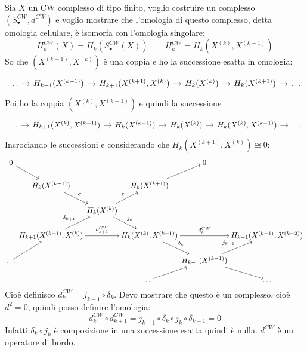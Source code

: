 Sia $ X $ un CW complesso di tipo finito, voglio costruire un complesso $ (S_\bullet^{CW}, d^{CW}) $ e
voglio mostrare che l'omologia di questo complesso, detta omologia cellulare, è isomorfa con
l'omologia singolare:
\[
  H_k^{CW}(X) = H_k(S^{CW}_\bullet(X)) \qquad H_k^{CW} = H_k(X^{(k)}, X^{(k-1)})
\]
So che $ (X^{(k+1)}, X^{(k)}) $ è una coppia
e ho la successione esatta in omologia:
\[
  \begin{tikzcd}[nodes={column sep=10pt}]
    \dots \rar  & H_{k+1}(X^{(k+1)}) \rar & H_{k+1}(X^{(k+1)}, X^{(k)}) \rar & H_k(X^{(k)})   \rar & H_k(X^{(k+1)}) \rar & \dots
  \end{tikzcd}
\]
Poi ho la coppia $ (X^{(k)}, X^{(k-1)}) $ e quindi la successione
\[
  \begin{tikzcd}[nodes={column sep=10pt}]
    \dots \rar & H_{k+1}(X^{(k)}, X^{(k-1)}) \rar & H_k(X^{(k-1)}) \rar & H_k(X^{(k)}) \rar & H_{k}(X^{(k)}, X^{(k-1)}) \rar & \dots
  \end{tikzcd}
\]
Incrociando le successioni e considerando che $ H_k(X^{(k+1)}, X^{(k)}) \cong 0$:
\[
  \begin{tikzcd}[nodes={column sep=1pt, inner sep=2pt, outer sep=1pt}]
  0            \arrow{dr}{}      & {}                   & {}                                         & {}                           & 0  & {}\\
  {}                              & H_k(X^{(k-1)})   \arrow{dr}{\sigma}                 & {}                                    & H_k(X^{(k+1)})  \arrow{ur}{} & {} & {}\\
  {}                             & {}             & H_k(X^{(k)})   \arrow{dr}{j_k}   \arrow{ur}{\tau} & {}                           & {} & {}\\
  {}  & H_{k+1}(X^{(k+1)}, X^{(k)})  \arrow{ur}{\delta_{k+1}} \arrow{rr}{d_{k+1}^{CW}} & {}      & H_k(X^{(k)}, X^{(k-1)})  \arrow{rr}{d_{k}^{CW}}   \arrow{dr}{\delta_k}  & {} &  H_{k-1}(X^{(k-1)}, X^{(k-2)}) \\
  \dots \arrow{ur}{} & {} & {} & {} & H_{k-1}(X^{(k-1)}) \arrow{ur}{j_{k-1}} \arrow{dr}{} & {} \\
  {} & {} & {} & \dots \arrow{ur}{} & {} & \dots
\end{tikzcd}
\]
Cioè definisco $ d_k^{CW} = j_{k-1} \circ \delta_k $. Devo mostrare che questo è un complesso, cioè $ d^2 = 0 $,
quindi posso definire l'omologia:
\[
   d_k^{CW} \circ  d_{k+1}^{CW} = j_{k-1} \circ \delta_k \circ j_k \circ \delta_{k+1} = 0
\]
Infatti $ \delta_k \circ j_k $ è composizione in una successione esatta quindi è nulla.
$ d^{CW} $ è un operatore di bordo.

